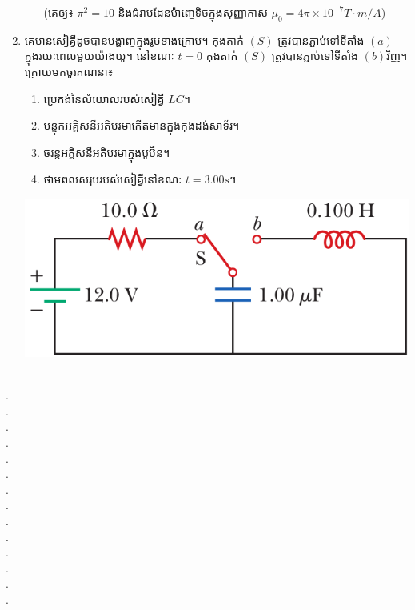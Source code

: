 \documentclass{officialexam}
\begin{document}
\begin{enumerate}[I]
\begin{enumerate}[k]
		(គេឲ្យ៖ $\pi^2=10$ និងជំរាបដែនម៉ាញេទិចក្នុងសុញ្ញាកាស $\mu_0=4\pi\times10^{-7}T\cdot m/A$)
	\end{enumerate}
	\item គេមានសៀគ្វីដូចបានបង្ហាញក្នុងរូបខាងក្រោម។ កុងតាក់ $(S)$ ត្រូវបានភ្ជាប់ទៅទីតាំង $(a)$ ក្នុងរយៈពេលមួយយ៉ាងយូ។ នៅខណៈ $t=0$ កុងតាក់ $(S)$ ត្រូវបានភ្ជាប់ទៅទីតាំង $(b)$​វិញ។ ក្រោយមកចូរគណនា៖
	\begin{multicols}{2}
		\begin{enumerate}[k]
			\item ប្រេកង់នៃលំយោលរបស់សៀគ្វី $LC$។
			\item បន្ទុកអគ្គិសនីអតិបរមាកើតមានក្នុងកុងដង់សាទ័រ។
			\item ចរន្តអគ្គិសនីអតិបរមាក្នុងបូប៊ីន។
			\item ថាមពលសរុបរបស់សៀគ្វីនៅខណៈ $t=3.00s$។
		\end{enumerate}
		\includegraphics[scale=0.35]{image2}
	\end{multicols}
\end{enumerate}
\\
{\color{white}.}\dotfill\\
{\color{white}.}\dotfill\\
{\color{white}.}\dotfill
\\
{\color{white}.}\dotfill\\
{\color{white}.}\dotfill\\
{\color{white}.}\dotfill
\\
{\color{white}.}\dotfill\\
{\color{white}.}\dotfill\\
{\color{white}.}\dotfill
\\
{\color{white}.}\dotfill\\
{\color{white}.}\dotfill\\
{\color{white}.}\dotfill
\\
{\color{white}.}\dotfill\\
{\color{white}.}\dotfill\\
\end{document}
